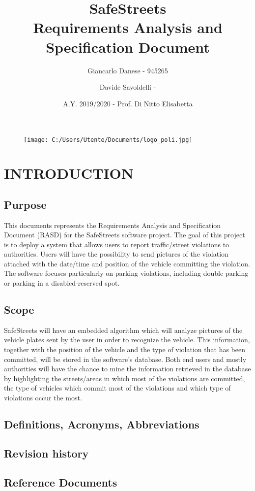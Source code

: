 \documentclass[12pt,a4paper]{article}
\author{Giancarlo Danese - 945265}
\author{Davide Savoldelli - }
\date{A.Y. 2019/2020 - Prof. Di Nitto Elisabetta}
\title{
 \textbf{\Huge{SafeStreets}} \\
 \large Requirements Analysis and Specification Document
}
\begin{document}
 \begin{figure}
  \centering
  \texttt{[image: C:/Users/Utente/Documents/logo\_poli.jpg]}
 \end{figure}

 \maketitle
 \newpage
 \tableofcontents
 \newpage

\section{INTRODUCTION}
\subsection{Purpose} 
This documents represents the Requirements Analysis and Specification Document (RASD) for the SafeStreets software project.
The goal of this project is to deploy a system that allows users to report traffic/street violations to authorities. Users will have the possibility to send pictures of the violation attached with the date/time and position of the vehicle committing the violation. The software focuses particularly on parking violations, including double parking or parking in a disabled-reserved spot.
\subsection{Scope}
SafeStreets will have an embedded algorithm which will analyze pictures of the vehicle plates sent by the user in order to recognize the vehicle. This information, together with the position of the vehicle and the type of violation that has been committed, will be stored in the software's database. Both end users and mostly authorities will have the chance to mine the information retrieved in the database by highlighting the streets/areas in which most of the violations are committed, the type of vehicles which commit most of the violations and which type of violations occur the most. 
\subsection{Definitions, Acronyms, Abbreviations} 
\subsection{Revision history} 
\subsection{Reference Documents} 
\end{document}
